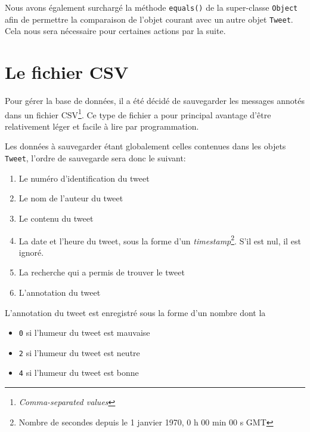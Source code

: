 \documentclass[12pt,a4paper]{report}
\begin{document}
Nous avons également surchargé la méthode \texttt{equals()} de la super-classe
\texttt{Object} afin de permettre la comparaison de l'objet courant avec un
autre objet \texttt{Tweet}. Cela nous sera nécessaire pour certaines actions par
la suite.

\section{Le fichier CSV}

Pour gérer la base de données, il a été décidé de sauvegarder les messages
annotés dans un fichier CSV\footnote{\textit{Comma-separated values}}. Ce type
de fichier a pour principal avantage d'être relativement léger et facile à lire
par programmation.

Les données à sauvegarder étant globalement celles contenues dans les objets
\texttt{Tweet}, l'ordre de sauvegarde sera donc le suivant:

\begin{enumerate}
	\item
		Le numéro d'identification du tweet
	\item
		Le nom de l'auteur du tweet
	\item
		Le contenu du tweet
	\item
		La date et l'heure du tweet, sous la forme d'un
		\textit{timestamp}\footnote{Nombre de secondes depuis le 
		1\ier{} janvier 1970, 0 h 00 min 00 s GMT}. S'il est nul, il est
		ignoré.
	\item
		La recherche qui a permis de trouver le tweet
	\item
		L'annotation du tweet
\end{enumerate}

L'annotation du tweet est enregistré sous la forme d'un nombre dont la 

\begin{itemize}
	\item
		\texttt{0} si l'humeur du tweet est mauvaise
	\item
		\texttt{2} si l'humeur du tweet est neutre
	\item
		\texttt{4} si l'humeur du tweet est bonne
\end{itemize}
\end{document}
